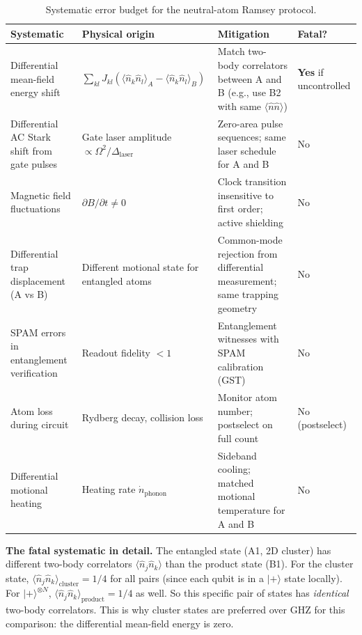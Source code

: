 \documentclass[12pt,letterpaper]{article}
\theoremstyle{plain}
\theoremstyle{definition}
\theoremstyle{remark}
\begin{document}
\begin{table}[h]
\centering\small
\caption{Systematic error budget for the neutral-atom Ramsey protocol.}
\label{tab:systematics}
\begin{tabular}{@{}p{4.5cm}p{3.5cm}p{3.5cm}p{2cm}@{}}
\toprule
Systematic & Physical origin & Mitigation & Fatal? \\
\midrule
Differential mean-field energy shift
& $\sum_{kl}J_{kl}(\langle\hat{n}_k\hat{n}_l\rangle_A - \langle\hat{n}_k\hat{n}_l\rangle_B)$
& Match two-body correlators between A and B (e.g., use B2 with same $\langle\hat{n}\hat{n}\rangle$)
& \textbf{Yes} if uncontrolled \\
\addlinespace
Differential AC Stark shift from gate pulses
& Gate laser amplitude $\propto\Omega^2/\Delta_{\mathrm{laser}}$
& Zero-area pulse sequences; same laser schedule for A and B
& No \\
\addlinespace
Magnetic field fluctuations
& $\partial B/\partial t \neq 0$
& Clock transition insensitive to first order; active shielding
& No \\
\addlinespace
Differential trap displacement (A vs B)
& Different motional state for entangled atoms
& Common-mode rejection from differential measurement; same trapping geometry
& No \\
\addlinespace
SPAM errors in entanglement verification
& Readout fidelity $< 1$
& Entanglement witnesses with SPAM calibration (GST)
& No \\
\addlinespace
Atom loss during circuit
& Rydberg decay, collision loss
& Monitor atom number; postselect on full count
& No (postselect) \\
\addlinespace
Differential motional heating
& Heating rate $\dot{n}_{\mathrm{phonon}}$
& Sideband cooling; matched motional temperature for A and B
& No \\
\bottomrule
\end{tabular}
\end{table}

\textbf{The fatal systematic in detail.}
The entangled state (A1, 2D cluster) has different two-body correlators
$\langle\hat{n}_j\hat{n}_k\rangle$ than the product state (B1).  For the cluster state,
$\langle\hat{n}_j\hat{n}_k\rangle_{\mathrm{cluster}} = 1/4$ for all pairs
(since each qubit is in a $|+\rangle$ state locally).  For $|+\rangle^{\otimes N}$,
$\langle\hat{n}_j\hat{n}_k\rangle_{\mathrm{product}} = 1/4$ as well.  So this specific
pair of states has \emph{identical} two-body correlators.  This is why cluster states
are preferred over GHZ for this comparison: the differential mean-field energy is zero.
\end{document}
